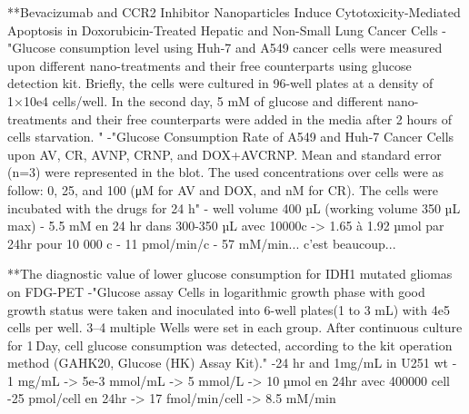 \documentclass[11pt,a4paper]{article}
\begin{document}
**Bevacizumab and CCR2 Inhibitor Nanoparticles Induce Cytotoxicity-Mediated Apoptosis in Doxorubicin-Treated Hepatic and Non-Small Lung Cancer Cells 
-"Glucose consumption level using Huh-7 and A549 cancer cells were measured upon different nano-treatments and their free counterparts using glucose detection kit. Briefly, the cells were cultured in 96-well plates at a density of 1×10e4 cells/well. In the second day, 5 mM of glucose and different nano-treatments and their free counterparts were added in the media after 2 hours of cells starvation. "
-"Glucose Consumption Rate of A549 and Huh-7 Cancer Cells upon AV, CR, AVNP, CRNP, and DOX+AVCRNP. Mean and standard error (n=3) were represented in the blot. The used concentrations over cells were as follow: 0, 25, and 100 (μM for AV and DOX, and nM for CR). The cells were incubated with the drugs for 24 h"
- well volume 400 µL (working volume 350 µL max)
- 5.5 mM en 24 hr dans 300-350 µL  avec 10000c -> 1.65 à 1.92 µmol par 24hr pour 10 000 c 
- 11 pmol/min/c 
- 57 mM/min... c'est beaucoup...

**The diagnostic value of lower glucose consumption for IDH1 mutated gliomas on FDG-PET
-"Glucose assay
Cells in logarithmic growth phase with good growth status were taken and inoculated into 6-well plates(1 to 3 mL) with 4e5 cells per well. 3–4 multiple Wells were set in each group. After continuous culture for 1 Day, cell glucose consumption was detected, according to the kit operation method (GAHK20, Glucose (HK) Assay Kit)."
-24 hr and 1mg/mL in  U251 wt
- 1 mg/mL -> 5e-3 mmol/mL -> 5 mmol/L -> 10 µmol en 24hr avec 400000 cell
-25 pmol/cell en 24hr -> 17 fmol/min/cell -> 8.5 mM/min
\end{document}
